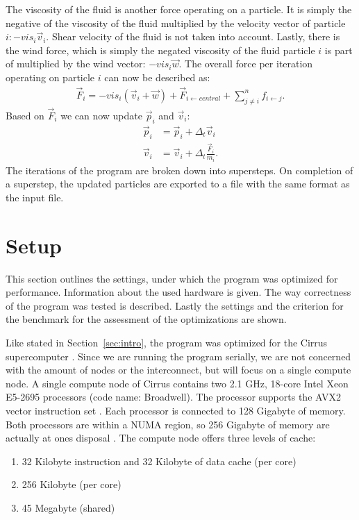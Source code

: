 \documentclass[twoside,11pt]{article}
\begin{document}
The viscosity of the fluid is another force operating on a particle.
It is simply the negative of the viscosity of the fluid multiplied
by the velocity vector of particle $i: -vis_i \vec{v}_i$.
Shear velocity of the fluid is not taken into account.
Lastly, there is the wind force, which is simply the negated viscosity
of the fluid particle $i$ is part of multiplied by the wind vector:
$-vis_i \vec{w}$.
The overall force per iteration operating on particle $i$ can now
be described as:
\begin{align}
  \vec{F}_i = -vis_i(\vec{v}_i + \vec{w}) +
              \vec{F}_{i \leftarrow central} +
              \sum_{j\neq i}^n f_{i \leftarrow j}.
\end{align}
Based on $\vec{F}_i$ we can now update $\vec{p}_i$ and $\vec{v}_i$:
\begin{align}
  \vec{p}_i &= \vec{p}_i + \Delta_t \vec{v}_i \\
  \vec{v}_i &= \vec{v}_i + \Delta_t \frac{\vec{F}_i}{m_i}.
\end{align}
The iterations of the program are broken down into supersteps.
On completion of a superstep, the updated particles are exported to a
file with the same format as the input file.


\section{Setup} %
\label{sec:setup}

This section outlines the settings, under which the program was
optimized for performance. Information about the used hardware is
given.
The way correctness of the program was tested is described.
Lastly the settings and the criterion for the benchmark for the
assessment of the optimizations are shown.

Like stated in Section~\ref{sec:intro}, the program was optimized for
the Cirrus supercomputer \citep{cirrus}.
Since we are running the program serially, we are not concerned with
the amount of nodes or the interconnect, but will focus on a single
compute node.
A single compute node of Cirrus contains two 2.1 GHz, 18-core Intel
Xeon E5-2695 processors (code name: Broadwell).
The processor supports the AVX2 vector instruction set \citep{avx2}.
Each processor is connected to 128 Gigabyte of memory.
Both processors are within a NUMA region, so 256 Gigabyte of memory
are actually at ones disposal \citep{cirrus_hardware}.
The compute node offers three levels of cache:
\begin{enumerate}
  \item 32 Kilobyte instruction and 32 Kilobyte of data cache
        (per core)
  \item 256 Kilobyte (per core)
  \item 45 Megabyte (shared)
\end{enumerate}
\end{document}
